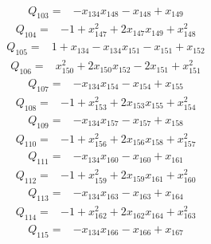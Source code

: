 \documentclass[11pt]{article}
\theoremstyle{definition}\newtheorem{definition}[theorem]{Definition}
\begin{document}
{\begin{align*}
\end{align*}
\begin{align*}
 Q_{103}={}&-x_{134}x_{148} -x_{148} +x_{149}
\end{align*}
\begin{align*}
 Q_{104}={}&-1 +x_{147}^{2} +2x_{147}x_{149} +x_{148}^{2}
\end{align*}
\begin{align*}
 Q_{105}={}&1 +x_{134} -x_{134}x_{151} -x_{151} +x_{152}
\end{align*}
\begin{align*}
 Q_{106}={}&x_{150}^{2} +2x_{150}x_{152} -2x_{151} +x_{151}^{2}
\end{align*}
\begin{align*}
 Q_{107}={}&-x_{134}x_{154} -x_{154} +x_{155}
\end{align*}
\begin{align*}
 Q_{108}={}&-1 +x_{153}^{2} +2x_{153}x_{155} +x_{154}^{2}
\end{align*}
\begin{align*}
 Q_{109}={}&-x_{134}x_{157} -x_{157} +x_{158}
\end{align*}
\begin{align*}
 Q_{110}={}&-1 +x_{156}^{2} +2x_{156}x_{158} +x_{157}^{2}
\end{align*}
\begin{align*}
 Q_{111}={}&-x_{134}x_{160} -x_{160} +x_{161}
\end{align*}
\begin{align*}
 Q_{112}={}&-1 +x_{159}^{2} +2x_{159}x_{161} +x_{160}^{2}
\end{align*}
\begin{align*}
 Q_{113}={}&-x_{134}x_{163} -x_{163} +x_{164}
\end{align*}
\begin{align*}
 Q_{114}={}&-1 +x_{162}^{2} +2x_{162}x_{164} +x_{163}^{2}
\end{align*}
\begin{align*}
 Q_{115}={}&-x_{134}x_{166} -x_{166} +x_{167}

\end{align*}}
\end{document}
